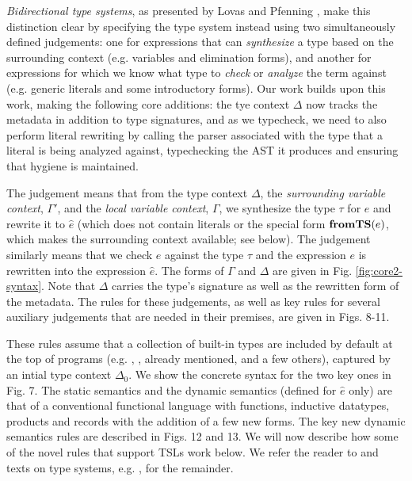 \emph{Bidirectional type systems}, as presented by Lovas and Pfenning \cite{Lovas08abidirectional}, make this distinction clear by specifying the type system instead using two simultaneously defined judgements: one for expressions that can \emph{synthesize} a type based on the surrounding context (e.g. variables and elimination forms), and another for expressions for which we know what type to \emph{check} or \emph{analyze} the term against (e.g. generic literals and some introductory forms). 
Our work builds upon this work, making the following core additions: the tye context $\Delta$ now tracks the metadata in addition to type signatures, and as we typecheck, we need to also perform literal rewriting by calling the parser associated with the type that a literal is being analyzed against, typechecking the AST it produces and ensuring that hygiene is maintained.

The judgement 
means that from the type context $\Delta$, the \emph{surrounding variable context}, $\Gamma'$, and the \emph{local variable context}, $\Gamma$, we synthesize the type $\tau$ for $e$ and rewrite it to  $\hat{e}$ (which does not contain literals or the special form $\textbf{fromTS}(e)$, which makes the surrounding context available; see below).
The judgement 
 similarly 
means that we check $e$ against the type $\tau$ and the expression $e$ is rewritten into the expression $\hat{e}$. The forms of $\Gamma$ and $\Delta$ are given in Fig. \ref{fig:core2-syntax}. Note that $\Delta$ carries the type's signature as well as the rewritten form of the metadata. The rules for these judgements, as well as key rules for several auxiliary judgements that are needed in their premises, are given in Figs. 8-11. 

These rules assume that a collection of built-in types are included by default at the top of programs (e.g. , ,  already mentioned, and a few others), captured by an intial type context $\Delta_0$. We show the concrete syntax for the two key ones in Fig. 7. The static semantics and the dynamic semantics (defined for $\hat{e}$ only) are that of a conventional functional language with functions, inductive datatypes, products and records  with the addition of a few new forms. The key new dynamic semantics rules are described in Figs. 12 and 13. We will now describe how some of the novel rules that support TSLs work below. We refer the reader to \cite{Lovas08abidirectional} and texts on type systems, e.g. \cite{pfpl,tapl}, for the remainder.


